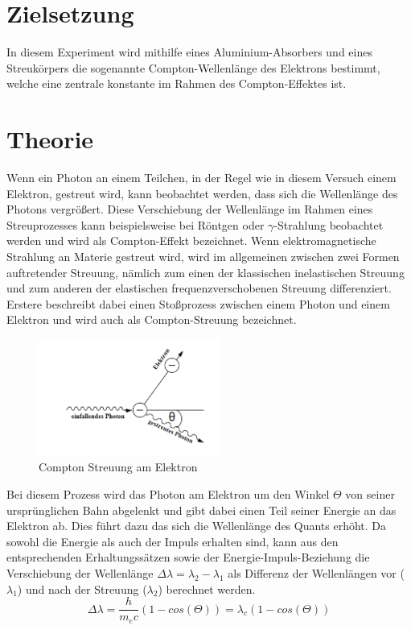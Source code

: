 \section{Zielsetzung}
In diesem Experiment wird mithilfe eines Aluminium-Absorbers und eines Streukörpers die sogenannte Compton-Wellenlänge des Elektrons bestimmt, welche eine zentrale konstante im Rahmen des Compton-Effektes ist.
\section{Theorie}
Wenn ein Photon an einem Teilchen, in der Regel wie in diesem Versuch einem Elektron, gestreut wird, kann beobachtet werden, dass sich die Wellenlänge des Photons vergrößert. Diese Verschiebung der Wellenlänge im Rahmen eines Streuprozesses kann beispielsweise bei Röntgen oder $\gamma$-Strahlung beobachtet werden und wird als Compton-Effekt bezeichnet.
Wenn elektromagnetische Strahlung an Materie gestreut wird, wird im allgemeinen zwischen zwei Formen auftretender Streuung, nämlich zum einen der klassischen inelastischen Streuung und zum anderen der elastischen frequenzverschobenen Streuung differenziert. Erstere beschreibt dabei einen Stoßprozess zwischen einem Photon und einem Elektron und wird auch als Compton-Streuung bezeichnet.
\begin{figure} [h]
    \centering
    \includegraphics[width=6cm, keepaspectratio]{Compton Effekt}
    \caption{Compton Streuung am Elektron}
    \label{fig:Compton}
 \end{figure}
Bei diesem Prozess wird das Photon am Elektron um den Winkel $\Theta$ von seiner ursprünglichen Bahn abgelenkt und gibt dabei einen Teil seiner Energie an das Elektron ab. Dies führt dazu das sich die Wellenlänge des Quants erhöht. Da sowohl die Energie als auch der Impuls erhalten sind, kann aus den entsprechenden Erhaltungssätzen sowie der Energie-Impuls-Beziehung die Verschiebung der Wellenlänge $\Delta \lambda=\lambda_2-\lambda _1$ als Differenz der Wellenlängen vor ($\lambda_1$) und nach der Streuung ($\lambda_2$) berechnet werden.
\begin{equation}
\Delta \lambda=\frac{h}{m_ec}(1-cos(\Theta))=\lambda_c(1-cos(\Theta))
\end{equation}
